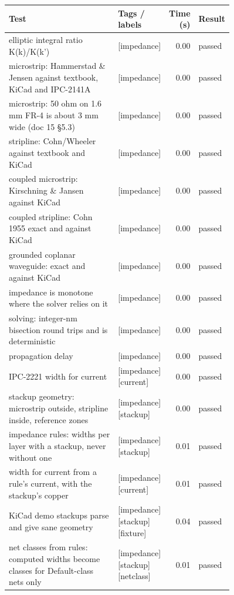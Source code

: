 \begin{longtable}{@{}p{0.57\linewidth}p{0.19\linewidth}rl@{}}
\toprule Test & Tags / labels & Time (s) & Result \\ \midrule \endhead
elliptic integral ratio K(k)/K(k') & {\footnotesize [impedance]} & 0.00 & passed \\
microstrip: Hammerstad \& Jensen against textbook, KiCad and IPC-2141A & {\footnotesize [impedance]} & 0.00 & passed \\
microstrip: 50 ohm on 1.6 mm FR-4 is about 3 mm wide (doc 15 \S5.3) & {\footnotesize [impedance]} & 0.00 & passed \\
stripline: Cohn/Wheeler against textbook and KiCad & {\footnotesize [impedance]} & 0.00 & passed \\
coupled microstrip: Kirschning \& Jansen against KiCad & {\footnotesize [impedance]} & 0.00 & passed \\
coupled stripline: Cohn 1955 exact and against KiCad & {\footnotesize [impedance]} & 0.00 & passed \\
grounded coplanar waveguide: exact and against KiCad & {\footnotesize [impedance]} & 0.00 & passed \\
impedance is monotone where the solver relies on it & {\footnotesize [impedance]} & 0.00 & passed \\
solving: integer-nm bisection round trips and is deterministic & {\footnotesize [impedance]} & 0.00 & passed \\
propagation delay & {\footnotesize [impedance]} & 0.00 & passed \\
IPC-2221 width for current & {\footnotesize [impedance][current]} & 0.00 & passed \\
stackup geometry: microstrip outside, stripline inside, reference zones & {\footnotesize [impedance][stackup]} & 0.00 & passed \\
impedance rules: widths per layer with a stackup, never without one & {\footnotesize [impedance][stackup]} & 0.01 & passed \\
width for current from a rule's current, with the stackup's copper & {\footnotesize [impedance][current]} & 0.01 & passed \\
KiCad demo stackups parse and give sane geometry & {\footnotesize [impedance][stackup][fixture]} & 0.04 & passed \\
net classes from rules: computed widths become classes for Default-class nets only & {\footnotesize [impedance][stackup][netclass]} & 0.01 & passed \\
\bottomrule\end{longtable}
